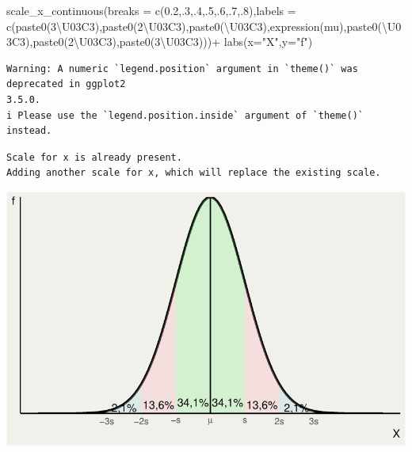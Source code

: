 \documentclass[
  letterpaper,
  DIV=11,
  numbers=noendperiod]{scrartcl}
\newenvironment{Shaded}{\begin{snugshade}}{\end{snugshade}}
\newcommand{\AttributeTok}[1]{\textcolor[rgb]{0.40,0.45,0.13}{#1}}
\newcommand{\DecValTok}[1]{\textcolor[rgb]{0.68,0.00,0.00}{#1}}
\newcommand{\FloatTok}[1]{\textcolor[rgb]{0.68,0.00,0.00}{#1}}
\newcommand{\FunctionTok}[1]{\textcolor[rgb]{0.28,0.35,0.67}{#1}}
\newcommand{\NormalTok}[1]{\textcolor[rgb]{0.00,0.23,0.31}{#1}}
\newcommand{\SpecialCharTok}[1]{\textcolor[rgb]{0.37,0.37,0.37}{#1}}
\newcommand{\StringTok}[1]{\textcolor[rgb]{0.13,0.47,0.30}{#1}}
\begin{document}
\begin{Shaded}
\begin{Highlighting}[]
  \FunctionTok{scale\_x\_continuous}\NormalTok{(}\AttributeTok{breaks =} \FunctionTok{c}\NormalTok{(}\FloatTok{0.2}\NormalTok{,.}\DecValTok{3}\NormalTok{,.}\DecValTok{4}\NormalTok{,.}\DecValTok{5}\NormalTok{,.}\DecValTok{6}\NormalTok{,.}\DecValTok{7}\NormalTok{,.}\DecValTok{8}\NormalTok{),}\AttributeTok{labels =} \FunctionTok{c}\NormalTok{(}\FunctionTok{paste0}\NormalTok{(}\StringTok{\textquotesingle{}{-}3\textbackslash{}U03C3\textquotesingle{}}\NormalTok{),}\FunctionTok{paste0}\NormalTok{(}\StringTok{\textquotesingle{}{-}2\textbackslash{}U03C3\textquotesingle{}}\NormalTok{),}\FunctionTok{paste0}\NormalTok{(}\StringTok{\textquotesingle{}{-}\textbackslash{}U03C3\textquotesingle{}}\NormalTok{),}\FunctionTok{expression}\NormalTok{(mu),}\FunctionTok{paste0}\NormalTok{(}\StringTok{\textquotesingle{}\textbackslash{}U03C3\textquotesingle{}}\NormalTok{),}\FunctionTok{paste0}\NormalTok{(}\StringTok{\textquotesingle{}2\textbackslash{}U03C3\textquotesingle{}}\NormalTok{),}\FunctionTok{paste0}\NormalTok{(}\StringTok{\textquotesingle{}3\textbackslash{}U03C3\textquotesingle{}}\NormalTok{)))}\SpecialCharTok{+}
  \FunctionTok{labs}\NormalTok{(}\AttributeTok{x=}\StringTok{"X"}\NormalTok{,}\AttributeTok{y=}\StringTok{"f"}\NormalTok{)}
\end{Highlighting}
\end{Shaded}

\begin{verbatim}
Warning: A numeric `legend.position` argument in `theme()` was deprecated in ggplot2
3.5.0.
i Please use the `legend.position.inside` argument of `theme()` instead.
\end{verbatim}

\begin{verbatim}
Scale for x is already present.
Adding another scale for x, which will replace the existing scale.
\end{verbatim}

\includegraphics{index_files/figure-pdf/unnamed-chunk-17-1.pdf}
\end{document}
